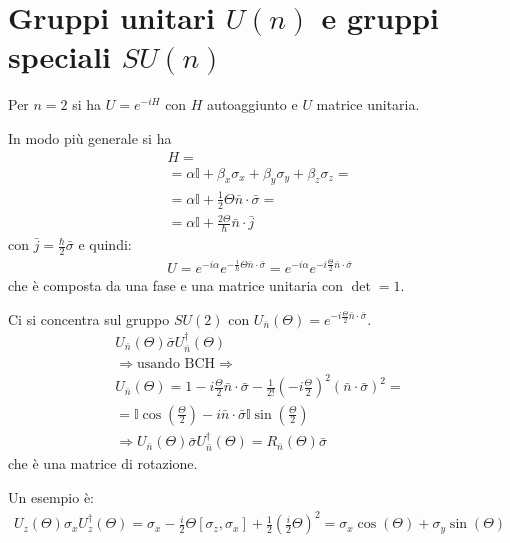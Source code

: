 \chapter[Gruppi unitari e speciali]{Gruppi unitari $U\left(n\right)$ e gruppi speciali $SU\left(n\right)$} %
Per $n=2$ si ha $U=e^{-iH}$ con $H$ autoaggiunto e $U$ matrice unitaria.

In modo più generale si ha
\begin{equation}\begin{split}
H=\\
=\alpha \mathbb{I}+\beta_x\sigma_x+\beta_y\sigma_y+\beta_z\sigma_z=\\
=\alpha\mathbb{I}+\frac{1}{2}\Theta\bar n\cdot \bar \sigma=\\
=\alpha\mathbb{I} +\frac{2\Theta}{\hbar }\bar n\cdot \bar j
\end{split}\end{equation}
con $\bar j=\frac{\hbar }{2}\bar \sigma$ e quindi:
\begin{equation}\begin{split}
U=e^{-i\alpha}e^{-\frac{i}{\hbar }{\Theta}\bar n\cdot \bar \sigma}=e^{-i\alpha}e^{-i\frac{\Theta}{2}\bar n\cdot \bar \sigma}
\end{split}\end{equation}
che è composta da una fase e una matrice unitaria con $\det=1$.

Ci si concentra sul gruppo $SU\left(2\right)$ con $U_{\bar n}\left(\Theta\right)=e^{-i\frac{\Theta}{2}\bar n\cdot \bar \sigma}$.
\begin{equation}\begin{split}
U_{\bar n}\left(\Theta\right)\bar \sigma U_{\bar n}^{\dag}\left(\Theta\right)\\
\Longrightarrow \textrm{usando BCH} \Longrightarrow \\
U_{\bar n}\left(\Theta\right)=1-i\frac{\Theta}{2}\bar n\cdot \bar \sigma -\frac{1}{2!}\left(-i\frac{\Theta}{2}\right)^2\left(\bar n\cdot \bar \sigma\right)^2=\\
=\mathbb{I} \cos{\left(\frac{\Theta}{2}\right)}-i\bar n\cdot \bar \sigma\mathbb{I}\sin{\left(\frac{\Theta}{2}\right)} \\
\Longrightarrow U_{\bar n}\left(\Theta\right)\bar \sigma U_{\bar n}^{\dag}\left(\Theta\right)=R_{\bar n}\left(\Theta\right)\bar \sigma
\end{split}\end{equation}
che è una matrice di rotazione.

Un esempio è:
\begin{equation}\begin{split}
U_z\left(\Theta\right)\sigma_xU_z^{\dag}\left(\Theta\right)=\sigma_x-\frac{i}{2}\Theta\left[\sigma_z,\sigma_x\right]+\frac{1}{2}\left(\frac{i}{2}\Theta\right)^2=\sigma_x\cos{\left(\Theta\right)}+\sigma_y\sin{\left(\Theta\right)}
\end{split}\end{equation}

